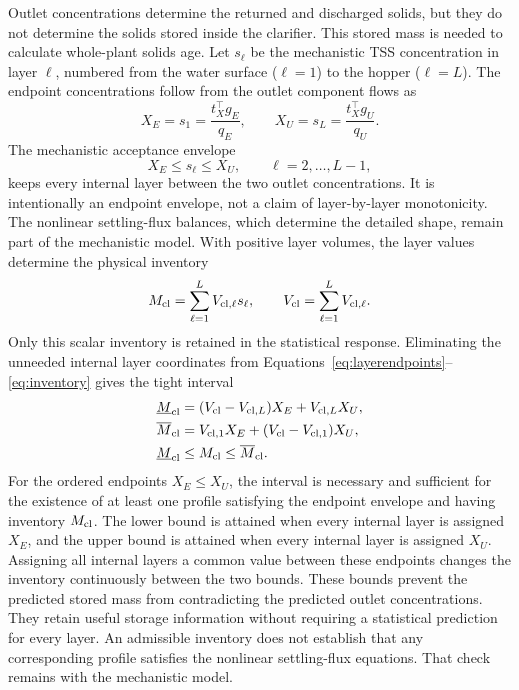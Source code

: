 \documentclass[a4paper,fleqn]{cas-sc}
\begin{document}
Outlet concentrations determine the returned and discharged solids, but they do not determine the solids stored inside the clarifier. This stored mass is needed to calculate whole-plant solids age. Let $s_\ell$ be the mechanistic TSS concentration in layer $\ell$, numbered from the water surface ($\ell=1$) to the hopper ($\ell=L$). The endpoint concentrations follow from the outlet component flows as
\begin{equation}
X_E=s_1=\frac{t_X^\top g_E}{q_E},\qquad
X_U=s_L=\frac{t_X^\top g_U}{q_U}.
\label{eq:layerendpoints}
\end{equation}
The mechanistic acceptance envelope
\begin{equation}
X_E\le s_\ell\le X_U,\qquad \ell=2,\ldots,L-1,
\label{eq:layerenvelope}
\end{equation}
keeps every internal layer between the two outlet concentrations. It is intentionally an endpoint envelope, not a claim of layer-by-layer monotonicity. The nonlinear settling-flux balances, which determine the detailed shape, remain part of the mechanistic model. With positive layer volumes, the layer values determine the physical inventory
\begin{equation}
M_{\rm cl}=\sum_{\ell=1}^{L}V_{{\rm cl},\ell}s_\ell,
\qquad V_{\rm cl}=\sum_{\ell=1}^{L}V_{{\rm cl},\ell}.
\label{eq:inventory}
\end{equation}
Only this scalar inventory is retained in the statistical response. Eliminating the unneeded internal layer coordinates from Equations~\eqref{eq:layerendpoints}--\eqref{eq:inventory} gives the tight interval
\begin{align}
\underline M_{\rm cl}&=(V_{\rm cl}-V_{{\rm cl},L})X_E+V_{{\rm cl},L}X_U,\notag\\
\overline M_{\rm cl}&=V_{{\rm cl},1}X_E+(V_{\rm cl}-V_{{\rm cl},1})X_U,\notag\\
\underline M_{\rm cl}&\le M_{\rm cl}\le\overline M_{\rm cl}.
\label{eq:inventoryenvelope}
\end{align}
For the ordered endpoints $X_E\le X_U$, the interval is necessary and sufficient for the existence of at least one profile satisfying the endpoint envelope and having inventory $M_{\rm cl}$. The lower bound is attained when every internal layer is assigned $X_E$, and the upper bound is attained when every internal layer is assigned $X_U$. Assigning all internal layers a common value between these endpoints changes the inventory continuously between the two bounds. These bounds prevent the predicted stored mass from contradicting the predicted outlet concentrations. They retain useful storage information without requiring a statistical prediction for every layer. An admissible inventory does not establish that any corresponding profile satisfies the nonlinear settling-flux equations. That check remains with the mechanistic model.
\end{document}
